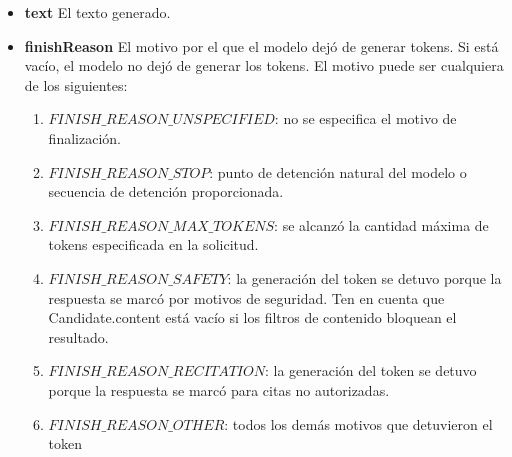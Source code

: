 \begin{itemize}
\item \textbf{text}	El texto generado.
\item \textbf{finishReason}	El motivo por el que el modelo dejó de generar tokens. Si está vacío, el modelo no dejó de generar los tokens. El motivo puede ser cualquiera de los siguientes:
\begin{enumerate}
	\item $FINISH\_REASON\_UNSPECIFIED$: no se especifica el motivo de finalización.
	\item $FINISH\_REASON\_STOP$: punto de detención natural del modelo o secuencia de detención proporcionada.
	\item $FINISH\_REASON\_MAX\_TOKENS$: se alcanzó la cantidad máxima de tokens especificada en la solicitud.
	\item $FINISH\_REASON\_SAFETY$: la generación del token se detuvo porque la respuesta se marcó por motivos de seguridad. Ten en cuenta que Candidate.content está vacío si los filtros de contenido bloquean el resultado.
	\item $FINISH\_REASON\_RECITATION$: la generación del token se detuvo porque la respuesta se marcó para citas no autorizadas.
	\item $FINISH\_REASON\_OTHER$: todos los demás motivos que detuvieron el token
\end{enumerate}


\end{itemize}
